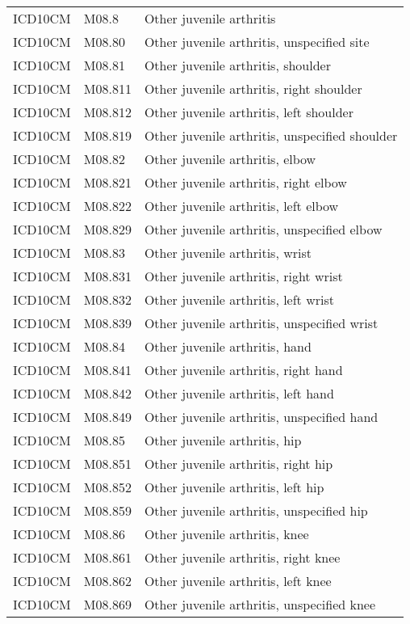 \begin{longtable}{p{}p{}p{}}
  ICD10CM & M08.8 & Other juvenile arthritis \\ 
  ICD10CM & M08.80 & Other juvenile arthritis, unspecified site \\ 
  ICD10CM & M08.81 & Other juvenile arthritis, shoulder \\ 
  ICD10CM & M08.811 & Other juvenile arthritis, right shoulder \\ 
  ICD10CM & M08.812 & Other juvenile arthritis, left shoulder \\ 
  ICD10CM & M08.819 & Other juvenile arthritis, unspecified shoulder \\ 
  ICD10CM & M08.82 & Other juvenile arthritis, elbow \\ 
  ICD10CM & M08.821 & Other juvenile arthritis, right elbow \\ 
  ICD10CM & M08.822 & Other juvenile arthritis, left elbow \\ 
  ICD10CM & M08.829 & Other juvenile arthritis, unspecified elbow \\ 
  ICD10CM & M08.83 & Other juvenile arthritis, wrist \\ 
  ICD10CM & M08.831 & Other juvenile arthritis, right wrist \\ 
  ICD10CM & M08.832 & Other juvenile arthritis, left wrist \\ 
  ICD10CM & M08.839 & Other juvenile arthritis, unspecified wrist \\ 
  ICD10CM & M08.84 & Other juvenile arthritis, hand \\ 
  ICD10CM & M08.841 & Other juvenile arthritis, right hand \\ 
  ICD10CM & M08.842 & Other juvenile arthritis, left hand \\ 
  ICD10CM & M08.849 & Other juvenile arthritis, unspecified hand \\ 
  ICD10CM & M08.85 & Other juvenile arthritis, hip \\ 
  ICD10CM & M08.851 & Other juvenile arthritis, right hip \\ 
  ICD10CM & M08.852 & Other juvenile arthritis, left hip \\ 
  ICD10CM & M08.859 & Other juvenile arthritis, unspecified hip \\ 
  ICD10CM & M08.86 & Other juvenile arthritis, knee \\ 
  ICD10CM & M08.861 & Other juvenile arthritis, right knee \\ 
  ICD10CM & M08.862 & Other juvenile arthritis, left knee \\ 
  ICD10CM & M08.869 & Other juvenile arthritis, unspecified knee \\ 

\end{longtable}
